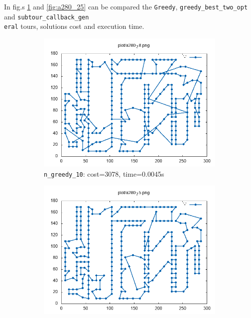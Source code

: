 In fig.s \ref{fig:a280_10} and \ref{fig:a280_25} can be compared the \texttt{Greedy}, \texttt{greedy\_best\_two\_opt} and \texttt{subtour\_callback\_gen \\ eral} tours, solutions cost and execution time.

\begin{figure}[!h]
	\begin{subfigure}{.5\columnwidth}
		\centering
		\includegraphics[width=\columnwidth]{../res/a280_28.png}
		\caption{\texttt{n\_greedy\_10}: cost=3078, time=0.0045s}
		\label{fig:a280_10}
	\end{subfigure}
	\begin{subfigure}{.5\columnwidth}
		\centering
		\includegraphics[width=\columnwidth]{../res/a280_25.png}

\end{subfigure}
\end{figure}
